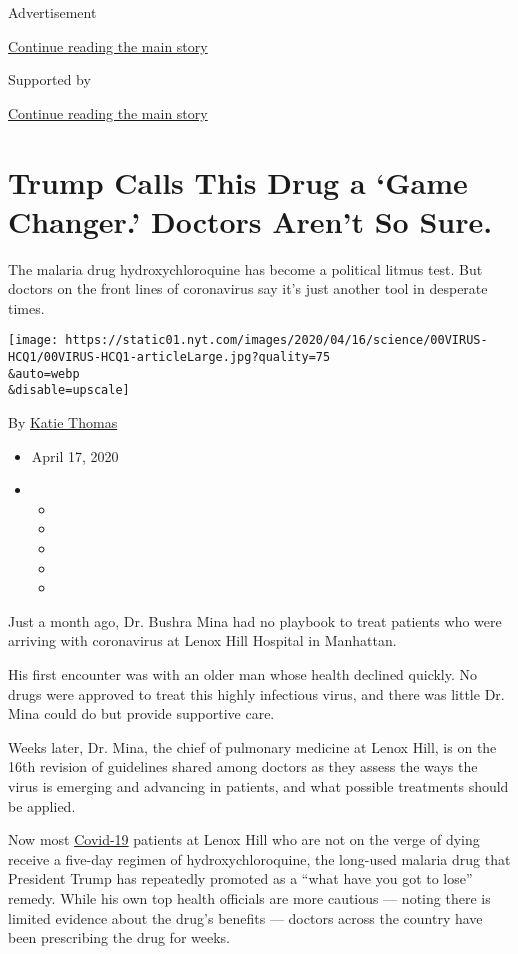 Advertisement

\protect\hyperlink{after-top}{Continue reading the main story}

Supported by

\protect\hyperlink{after-sponsor}{Continue reading the main story}

\hypertarget{trump-calls-this-drug-a-game-changer-doctors-arent-so-sure}{%
\section{Trump Calls This Drug a `Game Changer.' Doctors Aren't So
Sure.}\label{trump-calls-this-drug-a-game-changer-doctors-arent-so-sure}}

The malaria drug hydroxychloroquine has become a political litmus test.
But doctors on the front lines of coronavirus say it's just another tool
in desperate times.

\texttt{[image: https://static01.nyt.com/images/2020/04/16/science/00VIRUS-HCQ1/00VIRUS-HCQ1-articleLarge.jpg?quality=75\\\&auto=webp\\\&disable=upscale]}

By \href{https://www.nytimes.com/by/katie-thomas}{Katie Thomas}

\begin{itemize}
\item
  April 17, 2020
\item
  \begin{itemize}
  \item
  \item
  \item
  \item
  \item
  \end{itemize}
\end{itemize}

Just a month ago, Dr. Bushra Mina had no playbook to treat patients who
were arriving with coronavirus at Lenox Hill Hospital in Manhattan.

His first encounter was with an older man whose health declined quickly.
No drugs were approved to treat this highly infectious virus, and there
was little Dr. Mina could do but provide supportive care.

Weeks later, Dr. Mina, the chief of pulmonary medicine at Lenox Hill, is
on the 16th revision of guidelines shared among doctors as they assess
the ways the virus is emerging and advancing in patients, and what
possible treatments should be applied.

Now most
\href{https://www.nytimes.com/news-event/coronavirus?action=click\&pgtype=Article\&state=default\&module=STYLN_coronahub\&variant=show\&region=header\&context=menu}{Covid-19}
patients at Lenox Hill who are not on the verge of dying receive a
five-day regimen of hydroxychloroquine, the long-used malaria drug that
President Trump has repeatedly promoted as a ``what have you got to
lose'' remedy. While his own top health officials are more cautious ---
noting there is limited evidence about the drug's benefits --- doctors
across the country have been prescribing the drug for weeks.

